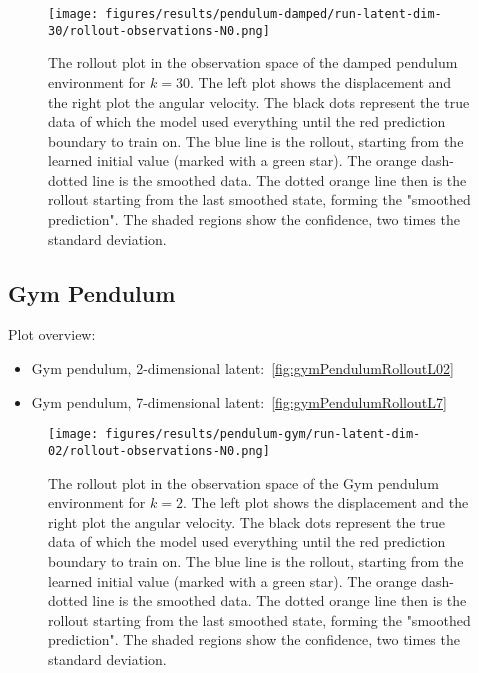 		\begin{figure}
			\centering
			\texttt{[image: figures/results/pendulum-damped/run-latent-dim-30/rollout-observations-N0.png]}
			\caption[Rollout of the damped pendulum experiment for 30 latent dimensions]{The rollout plot in the observation space of the damped pendulum environment for \(k = 30\). The left plot shows the displacement and the right plot the angular velocity. The black dots represent the true data of which the model used everything until the red prediction boundary to train on. The blue line is the rollout, starting from the learned initial value (marked with a green star). The orange dash-dotted line is the smoothed data. The dotted orange line then is the rollout starting from the last smoothed state, forming the "smoothed prediction". The shaded regions show the confidence, \ie two times the standard deviation.}
			\label{fig:pendulumDampedRolloutL30}
		\end{figure}

	\subsection{Gym Pendulum}
		Plot overview:
		\begin{itemize}
			\item Gym pendulum, 2-dimensional latent:~\autoref{fig:gymPendulumRolloutL02}
			\item Gym pendulum, 7-dimensional latent:~\autoref{fig:gymPendulumRolloutL7}
		\end{itemize}

		\begin{figure}
			\centering
			\texttt{[image: figures/results/pendulum-gym/run-latent-dim-02/rollout-observations-N0.png]}
			\caption[Rollout of the Gym pendulum experiment for 2 latent dimensions]{The rollout plot in the observation space of the Gym pendulum environment for \(k = 2\). The left plot shows the displacement and the right plot the angular velocity. The black dots represent the true data of which the model used everything until the red prediction boundary to train on. The blue line is the rollout, starting from the learned initial value (marked with a green star). The orange dash-dotted line is the smoothed data. The dotted orange line then is the rollout starting from the last smoothed state, forming the "smoothed prediction". The shaded regions show the confidence, \ie two times the standard deviation.}
			\label{fig:gymPendulumRolloutL02}
		\end{figure}

